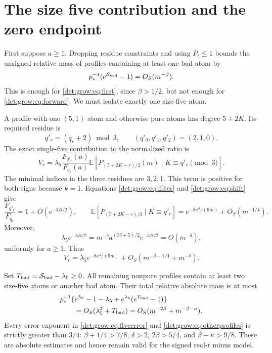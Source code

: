 \documentclass[11pt,letterpaper]{article}
\numberwithin{equation}{section}
\theoremstyle{definition}\newtheorem{definition}[theorem]{Definition}
\theoremstyle{remark}\newtheorem{remark}[theorem]{Remark}
\newcommand{\E}{\mathbb E}
\begin{document}
\section{The size five contribution and the zero endpoint}\label{det:grow:sec:five}
First suppose $a\ge1$. Dropping residue constraints and using
$P_\ell\le1$ bounds the unsigned relative mass of profiles containing
at least one bad atom by
\begin{equation}\label{det:grow:eq:roughbad}
 p_*^{-1}(e^{\mathcal S_{\rm bad}}-1)=O_S(m^{-\beta}).
\end{equation}
This is enough for \eqref{det:grow:eq:first}, since $\beta>1/2$, but not enough
for \eqref{det:grow:eq:forward}. We must isolate exactly one size-five atom.

A profile with one $(5,1)$ atom and otherwise pure atoms has degree
$5+2K$. Its required residue is
\begin{equation}\label{det:grow:eq:qprime}
 q'_r=(q_r+2)\bmod3,\qquad(q'_0,q'_1,q'_2)=(2,1,0).
\end{equation}
The exact single-five contribution to the normalized ratio is
\begin{equation}\label{det:grow:eq:singlefive}
 V_r=\lambda_5\frac{F_{q'_r}(a)}{F_{q_r}(a)}
 \E\left[P_{(5+2K-r)/3}(m)\mid K\equiv q'_r\pmod3\right].
\end{equation}
The minimal indices in the three residues are $3,2,1$. This term is
positive for both signs because $k=1$. Equations \eqref{det:grow:eq:filter} and
\eqref{det:grow:eq:shift} give
\[
 \frac{F_{q'_r}}{F_{q_r}}=1+O(e^{-3B/2}),\qquad
 \E[P_{(5+2K-r)/3}\mid K\equiv q'_r]
 =e^{-8a^4/(9m)}+O_S(m^{-1/4}).
\]
Moreover,
\[
 \lambda_5e^{-3B/2}
 =m^{-\delta}a^{(3\delta+5)/2}e^{-3B/2}=O(m^{-\delta}),
\]
uniformly for $a\ge1$. Thus
\begin{equation}\label{det:grow:eq:fiveerror}
 V_r=\lambda_5e^{-8a^4/(9m)}
       +O_S(m^{-\beta-1/4}+m^{-\delta}).
\end{equation}

Set $T_{\rm bad}=\mathcal S_{\rm bad}-\lambda_5\ge0$. All remaining
nonpure profiles contain at least two size-five atoms or another bad
atom. Their total relative absolute mass is at most
\begin{align}\label{det:grow:eq:otherprofiles}
 &p_*^{-1}\{e^{\lambda_5}-1-\lambda_5
              +e^{\lambda_5}(e^{T_{\rm bad}}-1)\}\notag\\
 &\hspace{2em}=O_S(\lambda_5^2+T_{\rm bad})
              =O_S(m^{-2\beta}+m^{-\beta-\kappa}).
\end{align}
Every error exponent in \eqref{det:grow:eq:fiveerror} and
\eqref{det:grow:eq:otherprofiles} is strictly greater than $3/4$:
$\beta+1/4>7/8$, $\delta>2$, $2\beta>5/4$, and
$\beta+\kappa>9/8$. These are absolute estimates and hence remain
valid for the signed real-$t$ minus model.
\end{document}
